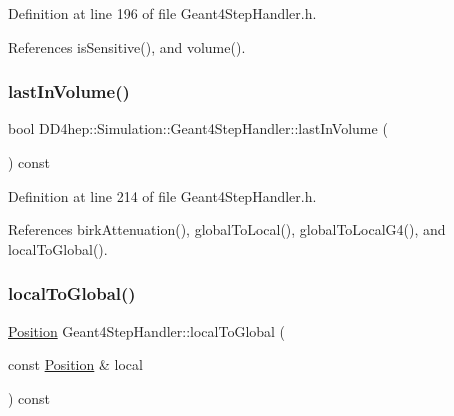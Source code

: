 Definition at line 196 of file Geant4\+Step\+Handler.\+h.



References is\+Sensitive(), and volume().

\hypertarget{class_d_d4hep_1_1_simulation_1_1_geant4_step_handler_a473152bc5d131b17fff220204f1a866c}{}\label{class_d_d4hep_1_1_simulation_1_1_geant4_step_handler_a473152bc5d131b17fff220204f1a866c} 
\subsubsection{\texorpdfstring{last\+In\+Volume()}{lastInVolume()}}
{\footnotesize\ttfamily bool D\+D4hep\+::\+Simulation\+::\+Geant4\+Step\+Handler\+::last\+In\+Volume (\begin{DoxyParamCaption}{ }\end{DoxyParamCaption}) const\hspace{0.3cm}{\ttfamily [inline]}}



Definition at line 214 of file Geant4\+Step\+Handler.\+h.



References birk\+Attenuation(), global\+To\+Local(), global\+To\+Local\+G4(), and local\+To\+Global().

\hypertarget{class_d_d4hep_1_1_simulation_1_1_geant4_step_handler_a5b70d64c9a938c857e5b63fa996aaf1e}{}\label{class_d_d4hep_1_1_simulation_1_1_geant4_step_handler_a5b70d64c9a938c857e5b63fa996aaf1e} 
\subsubsection{\texorpdfstring{local\+To\+Global()}{localToGlobal()}\hspace{0.1cm}{\footnotesize\ttfamily [1/4]}}
{\footnotesize\ttfamily \hyperlink{namespace_d_d4hep_1_1_geometry_a55083902099d03506c6db01b80404900}{Position} Geant4\+Step\+Handler\+::local\+To\+Global (\begin{DoxyParamCaption}\item[{const \hyperlink{namespace_d_d4hep_1_1_geometry_a55083902099d03506c6db01b80404900}{Position} \&}]{local }\end{DoxyParamCaption}) const}




